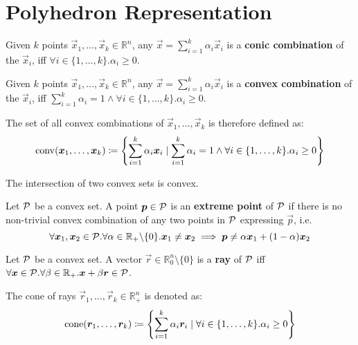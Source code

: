 \section{Polyhedron Representation}\label{sec:preliminaries_poly}

\begin{definition}
Given $k$ points $\vec{x}_1, \dots, \vec{x}_k \in \mathbb{R}^n$, any $\vec{x} = \sum_{i=1}^{k} \alpha_i \vec{x}_i$ is a \textbf{conic combination} of the $\vec{x}_i$, iff $\forall i \in \{1, \dots, k\}. \alpha_i \geq 0$.
\end{definition}

\begin{definition}\label{def:convex}
Given $k$ points $\vec{x}_1, \dots, \vec{x}_k \in \mathbb{R}^n$, any $\vec{x} = \sum_{i=1}^{k} \alpha_i \vec{x}_i$ is a \textbf{convex combination} of the $\vec{x}_i$, iff $\sum_{i=1}^{k} \alpha_i = 1 \land \forall i \in \{1, \dots, k\}. \alpha_i \geq 0$.

The set of all convex combinations of $\vec{x}_1, \dots, \vec{x}_k$ is therefore defined as:
\begin{equation*}
\operatorname{conv}({\bm{x}}_1, \dots, {\bm{x}}_k) \coloneqq \left\{\sum_{i=1}^{k} \alpha_i {\bm{x}}_i \mid \sum_{i=1}^{k} \alpha_i = 1 \land \forall i \in \{1, \dots, k\}. \alpha_i \geq 0 \right\}
\end{equation*}
\end{definition}

\begin{corollary}\label{cor:intersection_convex}
The intersection of two convex sets is convex.
\end{corollary}

\begin{definition}
Let $\mathcal{P}$ be a convex set. A point ${\bm{p}} \in \mathcal{P}$ is an \textbf{extreme point} of $\mathcal{P}$ if there is no non-trivial convex combination of any two points in $\mathcal{P}$ expressing $\vec{p}$, i.e.
\begin{equation*}
\forall {\bm{x}}_1, {\bm{x}}_2 \in \mathcal{P}. \forall \alpha \in \mathbb{R}_+ \backslash \{0\}. {\bm{x}}_1 \neq {\bm{x}}_2 \implies {\bm{p}} \neq \alpha {\bm{x}}_1 + (1 - \alpha) {\bm{x}}_2
\end{equation*}
\end{definition}

\begin{definition}\label{def:rays}
Let $\mathcal{P}$ be a convex set. A vector $\vec{r} \in \mathbb{R}_0^n \setminus \{0\}$ is a \textbf{ray} of $\mathcal{P}$ iff $\forall {\bm{x}} \in \mathcal{P}. \forall \beta \in \mathbb{R}_+. {\bm{x}} + \beta {\bm{r}} \in \mathcal{P}$.

The cone of rays $\vec{r}_1, \dots, \vec{r}_k \in \mathbb{R}_+^n$ is denoted as:
\begin{equation*}
\operatorname{cone}({\bm{r}}_1, \dots, {\bm{r}}_k) \coloneqq \left\{ \sum_{i=1}^{k} \alpha_i {\bm{r}}_i \mid \forall i \in \{1, \dots, k\}. \alpha_i \geq 0 \right\}
\end{equation*}
\end{definition}

